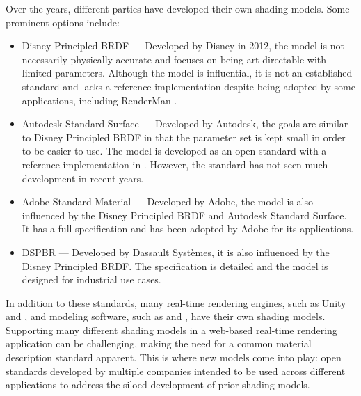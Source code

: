 Over the years, different parties have developed their own shading models. Some prominent options include:

\begin{itemize}
  \item{Disney Principled \gls{BRDF}} \cite{disney2012pbr} — Developed by Disney in 2012, the model is not necessarily physically accurate and focuses on being art-directable with limited parameters. Although the model is influential, it is not an established standard and lacks a reference implementation despite being adopted by some applications, including \gls{RenderMan} \cite{renderManDisneyPbrDocs}.
  \item{Autodesk Standard Surface} \cite{autodeskStandardSurface} — Developed by Autodesk, the goals are similar to Disney Principled \gls{BRDF} in that the parameter set is kept small in order to be easier to use. The model is developed as an open standard with a reference implementation in . However, the standard has not seen much development in recent years.
  \item{Adobe Standard Material} \cite{adobeStandardMaterial} — Developed by Adobe, the model is also influenced by the Disney Principled \gls{BRDF} and Autodesk Standard Surface. It has a full specification and has been adopted by Adobe for its applications.
  \item{\gls{DSPBR}} \cite{dspbrModel} — Developed by Dassault Systèmes, it is also influenced by the Disney Principled \gls{BRDF}. The specification is detailed and the model is designed for industrial use cases.
\end{itemize}

In addition to these standards, many real-time rendering engines, such as \gls{Unity} and , and modeling software, such as  and , have their own shading models. Supporting many different shading models in a web-based real-time rendering application can be challenging, making the need for a common material description standard apparent. This is where new models come into play: open standards developed by multiple companies intended to be used across different applications to address the siloed development of prior shading models.

